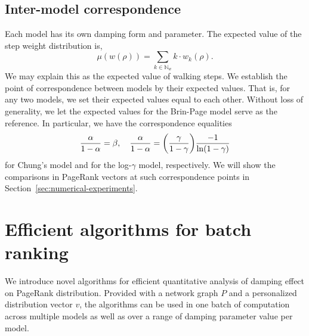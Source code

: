 \documentclass[conference]{IEEEtran}
\let\leftorig\left
\let\rightorig\right
\renewcommand{\left}{\mathopen{}\mathclose\bgroup\leftorig}
\renewcommand{\right}{\aftergroup\egroup\rightorig}
\begin{document}



\subsection{Inter-model correspondence}
\label{subsec:damping-corres}


Each model has its own damping form and parameter. The expected value of
the step weight distribution is, 
%
\begin{equation}
\label{eqn:expect-steps}
\mu(w(\rho)) = \sum_{k \in \mathbb{N}_{w}} k \cdot w_k(\rho). 
\end{equation}
%
We may explain this as the expected value of walking steps.  We
establish the point of correspondence between models by their expected
values. That is, for any two models, we set their expected values equal
to each other. Without loss of generality, we let the expected values
for the Brin-Page model serve as the reference. In particular, we have
the correspondence equalities
%
\begin{equation}
\label{eqn:param-corres}
  \frac{\alpha}{1-\alpha} = \beta, 
  \quad 
  \frac{\alpha}{1-\alpha} 
 = \left(\frac{\gamma}{1 - \gamma}\right)\frac{-1}{\ln(1 - \gamma)}
\end{equation}%
%
for Chung's model and for the log-$\gamma$ model, respectively. We will show
the comparisons in PageRank vectors at such correspondence points in
Section~\ref{sec:numerical-experiments}.




%


\section{Efficient algorithms for batch ranking}
\label{sec:batch-ranking}
% 
% 


We introduce novel algorithms for efficient quantitative analysis of
damping effect on PageRank distribution.  Provided with a network graph
$P$ and a personalized distribution vector $v$, the algorithms can be
used in one batch of computation across multiple models as well as over
a range of damping parameter value per model.
\end{document}
